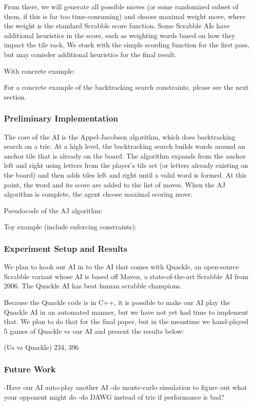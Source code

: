 \documentclass[12pt]{article}
\begin{document}
From there, we will generate all possible moves (or some randomized
subset of them, if this is far too time-consuming) and choose maximal
weight move, where the weight is the standard Scrabble score
function. Some Scrabble AIs have additional heuristics in the score,
such as weighting words based on how they impact the tile rack. We
stuck with the simple scording function for the first pass, but may
conisder additional heuristics for the final result.

With concrete example:

For a concrete example of the backtracking search constraints, please
see the next section.

\subsubsection*{Preliminary Implementation}
The core of the AI is the Appel-Jacobsen algorithm, which does
backtracking search on a trie. At a high level, the backtracking
search builds words around an anchor tile that is already on the
board. The algorithm expands from the anchor left and right using
letters from the player's tile set (or letters already existing on the
board) and then adds tiles left and right until a valid word is
formed. At this point, the word and its score are added to the
list of moves. When the AJ algorithm is complete, the agent choose maximal
scoring move.

Pseudocode of the AJ algorithm:


Toy example (include enforcing constraints):


\subsubsection*{Experiment Setup and Results}
We plan to hook our AI in to the AI that comes with Quackle, an
open-source Scrabble variant whose AI is based off Maven, a
state-of-the-art Scrabble AI from 2006. The Quackle AI has beat human
scrabble champions.

Because the Quackle code is in C++, it is possible to make our AI play
the Quackle AI in an automated manner, but we have not yet had time to
implement that. We plan to do that for the final paper, but in the
meantime we hand-played 5 games of Quackle vs our AI and present the
results below:

(Us vs Quackle)
234, 396


\subsubsection*{Future Work}
-Have our AI auto-play another AI
-do monte-carlo simulation to figure out what your opponent might do
-do DAWG instead of trie if performance is bad?
\end{document}
